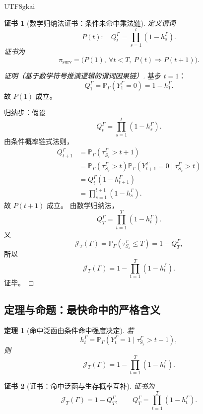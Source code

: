 \documentclass[12pt]{article}
\newtheorem{theorem}{定理}[section]
\newtheorem{Certificate}{证书}[section]
\begin{document}
\begin{CJK*}{UTF8}{gkai}
\begin{Certificate}[数学归纳法证书：条件未命中乘法链]
\label{cert:tex55-homtwist-survival-recursion}
定义谓词
\[
  P(t):\quad
  Q_t^\Gamma=\prod_{s=1}^{t}(1-h_s^\Gamma).
\]
证书为
\[
  \pi_{\mathrm{surv}}
  =
  \bigl(P(1),\ \forall t<T,\ P(t)\Rightarrow P(t+1)\bigr).
\]
\end{Certificate}

\begin{proof}[证明（基于数学符号推演逻辑的谓词因果链）]
基步 \(t=1\)：
\[
  Q_1^\Gamma
  =
  \mathbb P_\Gamma(Y_1^\Gamma=0)
  =
  1-h_1^\Gamma.
\]
故 \(P(1)\) 成立。

归纳步：假设
\[
  Q_t^\Gamma
  =
  \prod_{s=1}^{t}(1-h_s^\Gamma).
\]
由条件概率链式法则，
\[
\begin{aligned}
  Q_{t+1}^\Gamma
  &=
  \mathbb P_\Gamma(\tau_{S_\varepsilon}^\Gamma>t+1)\\
  &=
  \mathbb P_\Gamma(\tau_{S_\varepsilon}^\Gamma>t)
  \mathbb P_\Gamma(
  Y_{t+1}^\Gamma=0
  \mid
  \tau_{S_\varepsilon}^\Gamma>t
  )\\
  &=
  Q_t^\Gamma(1-h_{t+1}^\Gamma)\\
  &=
  \prod_{s=1}^{t+1}(1-h_s^\Gamma).
\end{aligned}
\]
故 \(P(t+1)\) 成立。
由数学归纳法，
\[
  Q_T^\Gamma
  =
  \prod_{t=1}^{T}(1-h_t^\Gamma).
\]
又
\[
  \mathcal J_T(\Gamma)
  =
  \mathbb P_\Gamma(\tau_{S_\varepsilon}^\Gamma\le T)
  =
  1-Q_T^\Gamma,
\]
所以
\[
  \mathcal J_T(\Gamma)
  =
  1-
  \prod_{t=1}^{T}(1-h_t^\Gamma).
\]
证毕。
\end{proof}

\subsection{定理与命题：最快命中的严格含义}
\label{subsec:tex55-homtwist-fastest-hit}

\begin{theorem}[命中泛函由条件命中强度决定]
\label{thm:tex55-homtwist-hit-functional-intensity}
若
\[
  h_t^\Gamma
  =
  \mathbb P_\Gamma(
  Y_t^\Gamma=1
  \mid
  \tau_{S_\varepsilon}^\Gamma>t-1),
\]
则
\[
  \boxed{
  \mathcal J_T(\Gamma)
  =
  1-
  \prod_{t=1}^{T}(1-h_t^\Gamma).
  }
\]
\end{theorem}

\begin{Certificate}[证书：命中泛函与生存概率互补]
\label{cert:tex55-homtwist-hit-functional-intensity}
证书为
\[
  \mathcal J_T(\Gamma)=1-Q_T^\Gamma,
  \qquad
  Q_T^\Gamma=\prod_{t=1}^{T}(1-h_t^\Gamma).
\]
\end{Certificate}


\end{CJK*}
\end{document}
